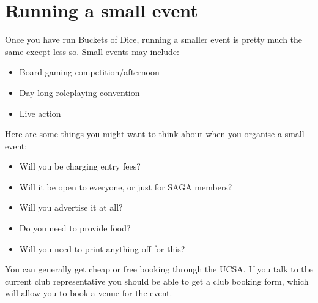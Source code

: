 \section{Running a small event}

Once you have run Buckets of Dice, running a smaller event is pretty much the same except less so. Small events may include:

\begin{itemize}
  \item Board gaming competition/afternoon
  \item Day-long roleplaying convention
  \item Live action
\end{itemize}

Here are some things you might want to think about when you organise a small event:

\begin{itemize}
  \item Will you be charging entry fees?
  \item Will it be open to everyone, or just for SAGA members?
  \item Will you advertise it at all?
  \item Do you need to provide food?
  \item Will you need to print anything off for this?
\end{itemize}

You can generally get cheap or free booking through the UCSA. If you talk to the current club representative you should  be able to get a club booking form, which will allow you to book a venue for the event.